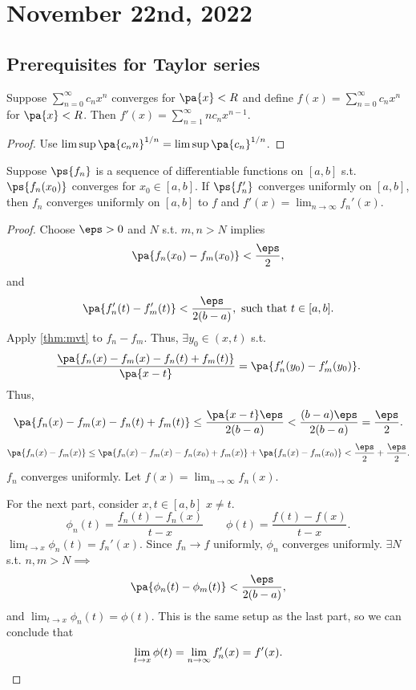 \documentclass[11pt]{scrartcl}
\numberwithin{equation}{section}
\begin{document}
\section{November 22nd, 2022}
\subsection{Prerequisites for Taylor series}
\begin{theorem}
    Suppose $\sum_{n=0}^{\infty}c_nx^n$ converges for $\pa{x}<R$ 
    and define $f(x)=\sum_{n=0}^{\infty}c_nx^n$ for $\pa{x}<R$.
    Then $f'(x) = \sum_{n=1}^{\infty}nc_nx^{n-1}$.
\end{theorem}
\begin{proof}
    Use $\limsup \pa{c_nn}^{1/n} = \limsup \pa{c_n}^{1/n}$.
\end{proof}
\begin{theorem}
    Suppose $\ps{f_n}$ is a sequence of differentiable functions on $[a,b]$ s.t.
    $\ps{f_n(x_0)}$ converges for $x_0\in [a,b]$. If $\ps{f_n'}$ converges 
    uniformly on $[a,b]$, then $f_n$ converges uniformly on $[a,b]$ 
    to $f$ and $f'(x) = \lim_{n\rightarrow \infty}f_n'(x)$.
\end{theorem}
\begin{proof}
    Choose $\eps>0$ and $N$ s.t. $m,n>N$ implies 
    \[
        \pa{f_n(x_0)-f_m(x_0)} < \frac{\eps}{2},
    \]
    and 
    \[
        \pa{f_n'(t)-f_m'(t)} < \frac{\eps}{2(b-a)}, \text{ such that } t\in [a,b].
    \]
    Apply \cref{thm:mvt} to $f_n-f_m$. Thus, $\exists y_0 \in (x,t)$
    s.t. 
    \[
        \frac{\pa{f_n(x)-f_m(x) - f_n(t)+f_m(t)}}{\pa{x-t}} = \pa{f_n'(y_0)-f_m'(y_0)}.
    \]
    Thus, 
    \[
        \pa{f_n(x)-f_m(x) - f_n(t)+f_m(t)} \leq \frac{\pa{x-t}\eps}{2(b-a)} < \frac{(b-a)\eps}{2(b-a)} = \frac{\eps}{2}.
    \]
    \[
        \pa{f_n(x)-f_m(x)} \leq \pa{f_n(x)-f_m(x) - f_n(x_0)+f_m(x)} + \pa{f_n(x)-f_m(x_0)} < \frac{\eps}{2}+\frac{\eps}{2}.
    \]
    $f_n$ converges uniformly. Let $f(x)=\lim_{n\rightarrow \infty}f_n(x)$.

    For the next part, consider $x,t \in [a,b]$ $x\neq t$.
    \[
        \phi_n(t) = \frac{f_n(t)-f_n(x)}{t-x} \qquad \phi(t) = \frac{f(t)-f(x)}{t-x}.
    \]
    $\lim_{t\rightarrow x}\phi_n(t) = f_n'(x)$. Since $f_n\to f$ uniformly,
     $\phi_n$ converges uniformly. $\exists N$ s.t. $n,m>N\implies $
    \[
        \pa{\phi_n(t)-\phi_m(t)} < \frac{\eps}{2(b-a)},
    \]
    and $\lim_{t\rightarrow x}\phi_n(t) = \phi(t)$.
    This is the same setup as the last part, so we can conclude that 
    \[
        \lim_{t\rightarrow x}\phi(t) = \lim_{n\rightarrow \infty}f_n'(x)=f'(x).
        \qedhere
    \]
\end{proof}
\end{document}
